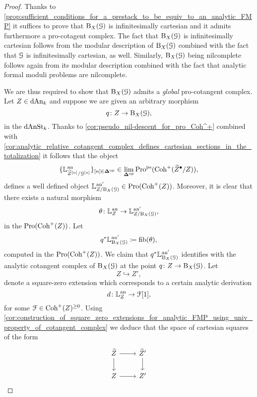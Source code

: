 \documentclass[10pt,a4paper,reqno]{amsart} %
\theoremstyle{plain}
\theoremstyle{definition}
\theoremstyle{remark}
\numberwithin{equation}{section}
\begin{document}
\begin{proof}
    Thanks to \cref{prop:sufficient_conditions_for_a_prestack_to_be_equiv_to_an_analytic_FMP} it suffices to prove that $\mathrm B_X(\mathcal G)$ is
    infinitesimally cartesian and it admits furthermore a pro-cotagent complex. The fact that $\mathrm B_X(\mathcal G)$ is infinitesimally cartesian follows from the
    modular description
    of $\mathrm B_X(\mathcal G)$ combined with the fact that $\mathcal G$ is infinitesimally cartesian, as well. Similarly, $\mathrm B_X(\mathcal G)$ being nilcomplete follows again from its
    modular description combined with the fact that analytic formal moduli problems are nilcomplete.
    
    
    We are thus required to show that $\mathrm B_X(\mathcal G)$ admits
    a \emph{global} pro-cotangent complex. Let $Z \in \mathrm{dAn}_k$ and suppose we are given an arbitrary morphism
        \[
            q \colon Z \to \mathrm B_X(\mathcal G),    
        \]
    in the \infcat $\mathrm{dAnSt}_k$.
    Thanks to \cref{cor:pseudo_nil-descent_for_pro_Coh^+} combined with \cref{cor:analytic_relative_cotangent_complex_defines_cartesian_sections_in_the_totalization}
    it follows that the object
        \[
            \{ \mathbb L^\mathrm{an}_{\widetilde Z^{[n]} / \mathcal G^{[n]}} \}_{[n] \in \bm{\Delta} ^\mathrm{op}} \in \lim_{\bm{\Delta} ^\mathrm{op}} \mathrm{Pro}^\mathrm{ps}(\mathrm{Coh}^+(\widetilde Z^\bullet / Z)), 
        \]
    defines a well defined object $ \mathbb L^{\mathrm{an}'}_{Z/ \mathrm B_X(\mathcal G)} \in \mathrm{Pro}(\mathrm{Coh}^+(Z))$. Moreover, it is clear that there exists a natural morphism
        \[
            \theta \colon \mathbb L^\mathrm{an}_Z \to \mathbb L^{\mathrm{an} '}_{Z /  \mathrm B_X(\mathcal G)},
        \]
    in the \infcat $\mathrm{Pro}(\mathrm{Coh}^+(Z))$. Let
        \[
            q^* \mathbb L^{\mathrm{an} '}_{\mathrm B_X(\mathcal G)}  \coloneqq \mathrm{fib}(\theta),
        \]
    computed in the \infcat $\mathrm{Pro}(\mathrm{Coh}^+(Z))$. We claim that $q^* \mathbb L^{\mathrm{an} '}_{\mathrm B_X(\mathcal G)}$ identifies with the analytic cotangent
    complex of $\mathrm B_X(\mathcal G)$ at the point $q \colon Z \to \mathrm B_X(\mathcal G)$. Let
        \[
            Z \hookrightarrow Z',  
        \]
    denote a square-zero extension which corresponds to a certain analytic derivation
        \[
            d \colon \mathbb L^\mathrm{an}_Z \to \mathcal F[1],  
        \]
    for some $\mathcal F \in \mathrm{Coh}^+(Z)^{\ge 0}$. Using \cref{cor:construction_of_square_zero_extensions_for_analytic_FMP_using_univ_property_of_cotangent_complex}
    we deduce that the space of cartesian squares of the form 
        \[
        \begin{tikzcd}
            \tZ \ar{r} \ar{d} & \tZ' \ar{d} \\
            Z \ar{r} & Z'
        \end{tikzcd}
        \]

\end{proof}
\end{document}
